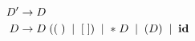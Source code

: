 
\begin{align*}
	D' &\to D  \\
	D &\to D\;((\;) \;\mid\; [\;]) \;\mid\; *\;D \;\mid\; (D) \;\mid\; \text{\bf id}
\end{align*}